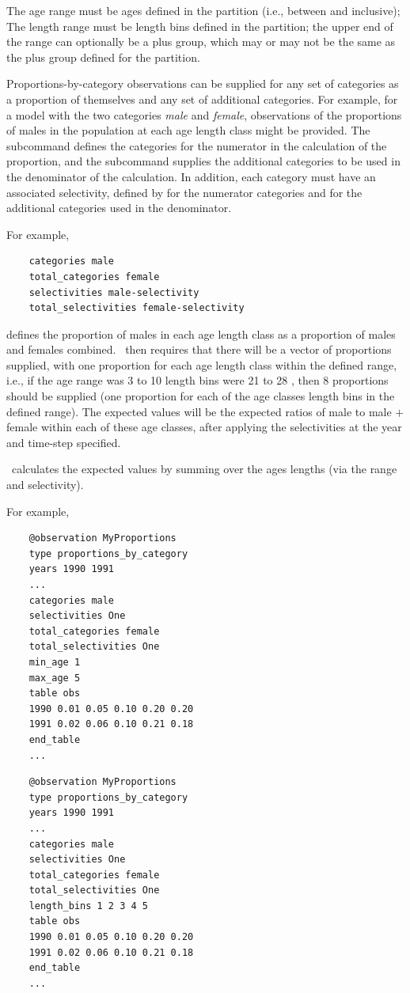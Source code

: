 \ifAgeBased 
The age range must be ages defined in the partition (i.e., between  and  inclusive); 
\else 
The length range must be length bins defined in the partition;
\fi
the upper end of the range can optionally be a plus group, which may or may not be the same as the plus group defined for the partition.

Proportions-by-category observations can be supplied for any set of categories as a proportion of themselves and any set of additional categories. For example, for a model with the two categories \emph{male} and \emph{female}, observations of the proportions of males in the population at each \ifAgeBased age \else length \fi class might be provided. The subcommand  defines the categories for the numerator in the calculation of the proportion, and the subcommand  supplies the additional categories to be used in the denominator of the calculation. In addition, each category must have an associated selectivity, defined by  for the numerator categories and  for the additional categories used in the denominator.

For example,

{\small{\begin{verbatim}
	categories male
	total_categories female
	selectivities male-selectivity
	total_selectivities female-selectivity
\end{verbatim}}}

defines the proportion of males in each \ifAgeBased age \else length \fi class as a proportion of males and females combined. \CNAME\ then requires that there will be a vector of proportions supplied, with one proportion for each \ifAgeBased age \else length \fi class within the defined range, i.e., if the \ifAgeBased age range was 3 to 10 \else length bins were 21 to 28 \fi, then 8 proportions should be supplied (one proportion for each of the \ifAgeBased age classes \else length bins \fi in the defined range). The expected values will be the expected ratios of male to male $+$ female within each of these age classes, after applying the selectivities at the year and time-step specified.

\CNAME\ calculates the expected values by summing over the \ifAgeBased ages \else lengths \fi (via the range and selectivity).

For example,
\ifAgeBased
{\small{\begin{verbatim}
	@observation MyProportions
	type proportions_by_category
	years 1990 1991
	...
	categories male
	selectivities One
	total_categories female
	total_selectivities One
	min_age 1
	max_age 5
	table obs
	1990 0.01 0.05 0.10 0.20 0.20
	1991 0.02 0.06 0.10 0.21 0.18
	end_table
	...
\end{verbatim}}}
\else
{\small{\begin{verbatim}
	@observation MyProportions
	type proportions_by_category
	years 1990 1991
	...
	categories male
	selectivities One
	total_categories female
	total_selectivities One
	length_bins 1 2 3 4 5
	table obs
	1990 0.01 0.05 0.10 0.20 0.20
	1991 0.02 0.06 0.10 0.21 0.18
	end_table
	...
\end{verbatim}}}
\fi 


